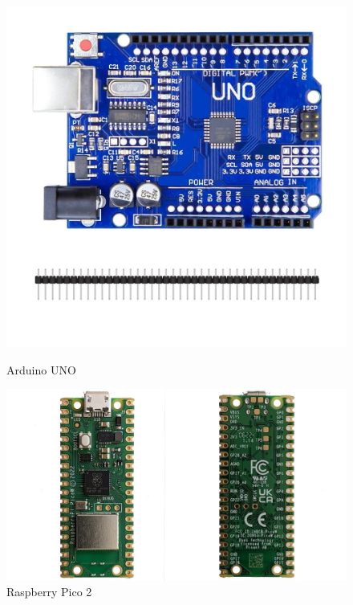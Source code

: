 \begin{figure}[h!]
    \centering
    \begin{minipage}{0.4\linewidth}
        \centering
        \includegraphics[width=\linewidth]{arduinoUNO.jpeg}
        \caption{Arduino UNO}
        \label{arduinoUNO}
    \end{minipage}\hfill
    \begin{minipage}{0.4\linewidth}
        \centering
        \includegraphics[width=\linewidth]{raspberry_pico2.jpg}
        \caption{Raspberry Pico 2}
        \label{raspberry}
    \end{minipage}
    \label{fig:comparacion_placas}
\end{figure}


